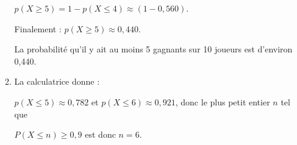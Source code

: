 \begin{enumerate}[resume]
\begin{enumerate}
$p(X\geqslant 5) = 1 - p(X\leqslant 4) \approx (1 - 0,560)$.

Finalement : $p(X\geqslant 5) \approx 0,440$.
		
La probabilité qu'il y ait au moins 5 gagnants sur 10 joueurs est d'environ 0,440.
		\item %
La calculatrice donne :
		
$p(X \leqslant 5) \approx 0,782$ et $p(X \leqslant 6) \approx 0,921$, donc 
le plus petit entier $n$ tel que 

$P(X \leqslant n) \geqslant 0,9$ est donc $n = 6$.
	\end{enumerate}
\end{enumerate}


\medskip

